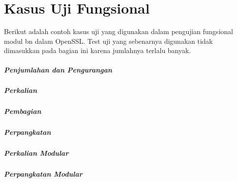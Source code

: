 
\chapter{Kasus Uji Fungsional} \label{sec:functional_testcase}

Berikut adalah contoh kasus uji yang digunakan dalam pengujian fungsional modul bn dalam OpenSSL. Test uji yang sebenarnya digunakan tidak dimasukkan pada bagian ini karena jumlahnya terlalu banyak.

\paragraph{Penjumlahan dan Pengurangan}

\paragraph{Perkalian}

\paragraph{Pembagian}

\paragraph{Perpangkatan}
%
\paragraph{Perkalian Modular}
%
\paragraph{Perpangkatan Modular}
